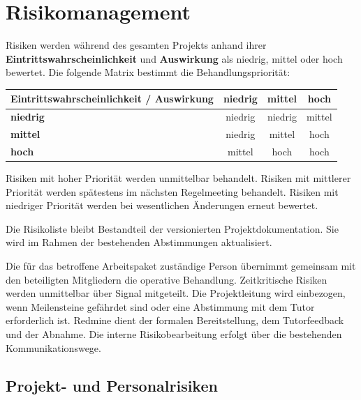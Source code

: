 \documentclass[11pt,a4paper]{article}
\begin{document}
\section{Risikomanagement}

Risiken werden während des gesamten Projekts anhand ihrer \textbf{Eintrittswahrscheinlichkeit} und \textbf{Auswirkung} als niedrig, mittel oder hoch bewertet. Die folgende Matrix bestimmt die Behandlungspriorität:

\begin{table}[H]\centering
\begin{tabular}{@{}p{4.2cm}ccc@{}}
\toprule
\textbf{Eintritts\-wahrscheinlichkeit / Auswirkung} & \textbf{niedrig} & \textbf{mittel} & \textbf{hoch} \\
\midrule
\textbf{niedrig} & niedrig & niedrig & mittel \\
\textbf{mittel} & niedrig & mittel & hoch \\
\textbf{hoch} & mittel & hoch & hoch \\
\bottomrule
\end{tabular}
\end{table}

Risiken mit hoher Priorität werden unmittelbar behandelt. Risiken mit mittlerer Priorität werden spätestens im nächsten Regelmeeting behandelt. Risiken mit niedriger Priorität werden bei wesentlichen Änderungen erneut bewertet.

Die Risikoliste bleibt Bestandteil der versionierten Projektdokumentation. Sie wird im Rahmen der bestehenden Abstimmungen aktualisiert.

Die für das betroffene Arbeitspaket zuständige Person übernimmt gemeinsam mit den beteiligten Mitgliedern die operative Behandlung. Zeitkritische Risiken werden unmittelbar über Signal mitgeteilt. Die Projektleitung wird einbezogen, wenn Meilensteine gefährdet sind oder eine Abstimmung mit dem Tutor erforderlich ist. Redmine dient der formalen Bereitstellung, dem Tutorfeedback und der Abnahme. Die interne Risikobearbeitung erfolgt über die bestehenden Kommunikationswege.

\subsection{Projekt- und Personalrisiken}
\end{document}
